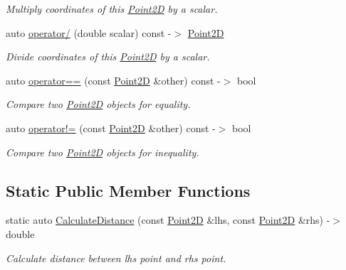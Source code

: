 \begin{DoxyCompactItemize}
\begin{DoxyCompactList}\small\item\em Multiply coordinates of this \hyperlink{classprogrammers_1_1geometry_1_1Point2D}{Point2D} by a scalar. \end{DoxyCompactList}\item 
auto \hyperlink{classprogrammers_1_1geometry_1_1Point2D_ad7cccfc72a15a6ff83cc583752d28dd4}{operator/} (double scalar) const -\/$>$ \hyperlink{classprogrammers_1_1geometry_1_1Point2D}{Point2D}
\begin{DoxyCompactList}\small\item\em Divide coordinates of this \hyperlink{classprogrammers_1_1geometry_1_1Point2D}{Point2D} by a scalar. \end{DoxyCompactList}\item 
auto \hyperlink{classprogrammers_1_1geometry_1_1Point2D_a901c0de565aba1fd759ea5d3badcf318}{operator==} (const \hyperlink{classprogrammers_1_1geometry_1_1Point2D}{Point2D} \&other) const -\/$>$ bool
\begin{DoxyCompactList}\small\item\em Compare two \hyperlink{classprogrammers_1_1geometry_1_1Point2D}{Point2D} objects for equality. \end{DoxyCompactList}\item 
auto \hyperlink{classprogrammers_1_1geometry_1_1Point2D_a14191b6d9b9b360390a36363c7d3569e}{operator!=} (const \hyperlink{classprogrammers_1_1geometry_1_1Point2D}{Point2D} \&other) const -\/$>$ bool
\begin{DoxyCompactList}\small\item\em Compare two \hyperlink{classprogrammers_1_1geometry_1_1Point2D}{Point2D} objects for inequality. \end{DoxyCompactList}\end{DoxyCompactItemize}
\subsection*{Static Public Member Functions}
\begin{DoxyCompactItemize}
\item 
static auto \hyperlink{classprogrammers_1_1geometry_1_1Point2D_abf28112f1ade679c2801422ca0254441}{Calculate\+Distance} (const \hyperlink{classprogrammers_1_1geometry_1_1Point2D}{Point2D} \&lhs, const \hyperlink{classprogrammers_1_1geometry_1_1Point2D}{Point2D} \&rhs) -\/$>$ double
\begin{DoxyCompactList}\small\item\em Calculate distance between lhs point and rhs point. \end{DoxyCompactList}\end{DoxyCompactItemize}


